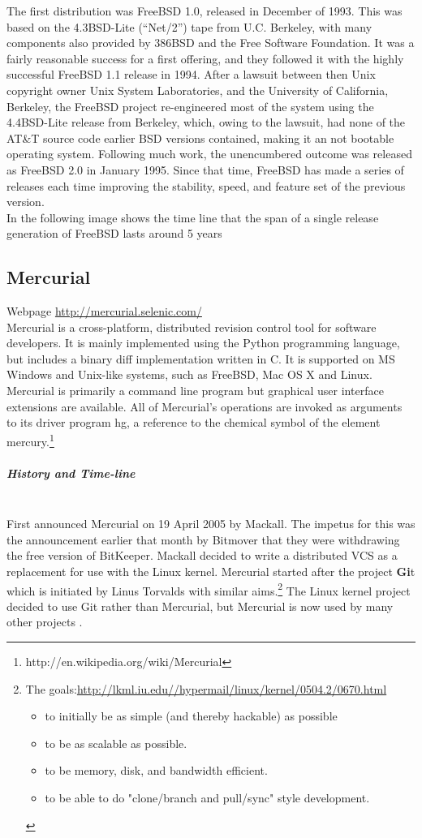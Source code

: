 \documentclass[11pt]{article} %
\begin{document}
The first distribution was FreeBSD 1.0, released in December of 1993. This was based on the 4.3BSD-Lite (“Net/2”) tape from U.C. Berkeley, with many components also provided by 386BSD and the Free Software Foundation. It was a fairly reasonable success for a first offering, and they followed it with the highly successful FreeBSD 1.1 release in 1994.
 After a lawsuit between then Unix copyright owner Unix System Laboratories, and the University of California, Berkeley, the FreeBSD project re-engineered most of the system using the 4.4BSD-Lite release from Berkeley, which, owing to the lawsuit, had none of the AT\&T source code earlier BSD versions contained, making it an not bootable operating system. Following much work, the unencumbered outcome was released as FreeBSD 2.0 in January 1995.
Since that time, FreeBSD has made a series of releases each time improving the stability, speed, and feature set of the previous version.\\
In the following image shows the time line that the span of a single release generation of FreeBSD lasts around 5 years
\pagebreak


\subsection{Mercurial}
Webpage \url{http://mercurial.selenic.com/}\\
Mercurial is a cross-platform, distributed revision control tool for software developers. It is mainly implemented using the Python programming language, but includes a binary diff implementation written in C. It is supported on MS Windows and Unix-like systems, such as FreeBSD, Mac OS X and Linux. Mercurial is primarily a command line program but graphical user interface extensions are available. All of Mercurial's operations are invoked as arguments to its driver program hg, a reference to the chemical symbol of the element mercury.\footnote{http://en.wikipedia.org/wiki/Mercurial}

  \subparagraph{History and Time-line} \mbox{} \\
    First announced Mercurial on 19 April 2005 by Mackall. The impetus for this was the announcement earlier that month by Bitmover that they were withdrawing the free version of BitKeeper. Mackall decided to write a distributed VCS as a replacement for use with the Linux kernel.
Mercurial started after the project {\bf Gi}t which is initiated by Linus Torvalds with similar aims.\footnote{ The goals:\url{http://lkml.iu.edu//hypermail/linux/kernel/0504.2/0670.html}
\begin{itemize}
\item to initially be as simple (and thereby hackable) as possible

\item to be as scalable as possible.

\item to be memory, disk, and bandwidth efficient.

\item to be able to do "clone/branch and pull/sync" style development. \end{itemize}
}
The Linux kernel project decided to use Git rather than Mercurial, but Mercurial is now used by many other projects .
\end{document}
